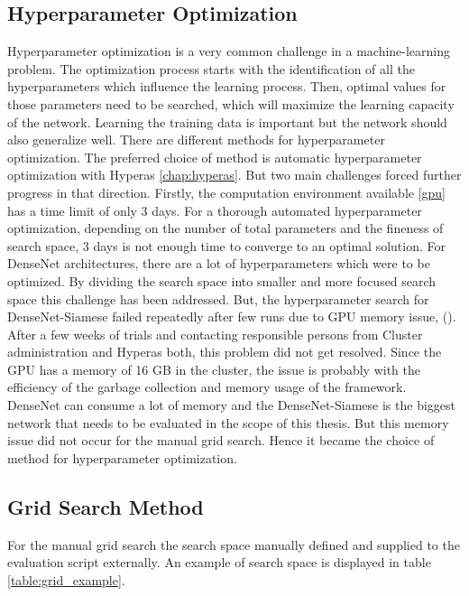 \subsection{Hyperparameter Optimization}
Hyperparameter optimization is a very common challenge in a machine-learning problem. The optimization process starts with the identification of all the hyperparameters which influence the learning process. Then, optimal values for those parameters
need to be searched, which will maximize the learning capacity of the network. Learning the training data is important but the network should also generalize well. There are different methods for hyperparameter optimization. The preferred choice
of method is automatic hyperparameter optimization with Hyperas \ref{chap:hyperas}. But two main challenges forced further progress in that direction. Firstly, the computation environment available \ref{gpu} has a time limit of only 
3 days. For a thorough automated hyperparameter optimization, depending on the number of total parameters and the fineness of search space, 3 days is not enough time to converge to an optimal solution. For DenseNet architectures, there are a lot of hyperparameters
which were to be optimized. By dividing the search space into smaller and more focused search space this challenge has been addressed. But, the hyperparameter search for DenseNet-Siamese failed repeatedly after few runs due to GPU 
memory issue, (). After a few weeks of trials and contacting responsible persons from Cluster administration and Hyperas both, this problem did not get resolved. Since the GPU has a memory of 16 GB in the cluster, the issue is probably with the efficiency of the garbage collection and memory usage of the framework. DenseNet can consume a lot of memory and the DenseNet-Siamese is the biggest network that needs to be evaluated in the scope of this thesis. But this memory issue
did not occur for the manual grid search. Hence it became the choice of method for hyperparameter optimization.


\subsection{Grid Search Method}
For the manual grid search the search space manually defined and supplied to the evaluation script externally. An example of search space is displayed in table \ref{table:grid_example}.


